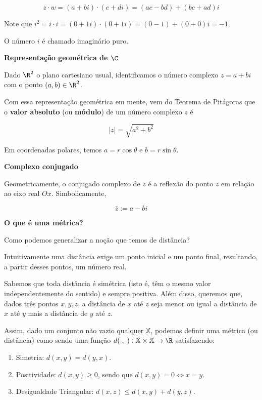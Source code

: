 \documentclass[
]{article}
\begin{document}
\[z \cdot w = (a+bi) \cdot (c+di) = (ac-bd) + (bc+ad)i\]

Note que
\(i^2 = i \cdot i = (0+1i) \cdot (0+1i) = (0-1) + (0+0)i = -1\).

O número \(i\) é chamado imaginário puro.

\textbf{Representação geométrica de \(\C\)}

Dado \(\R^2\) o plano cartesiano usual, identificamos o número complexo
\(z = a+bi\) com o ponto \((a, b) \in \R^2\).

Com essa representação geométrica em mente, vem do Teorema de Pitágoras
que o \textbf{valor absoluto} (ou \textbf{módulo}) de um número complexo
\(z\) é

\[|z| = \sqrt{a^2 + b^2}\]

Em coordenadas polares, temos \(a = r \cos \theta\) e
\(b = r \sin \theta\).

\textbf{Complexo conjugado}

Geometricamente, o conjugado complexo de \(z\) é a reflexão do ponto
\(z\) em relação ao eixo real \(Ox\). Simbolicamente,

\[\bar{z} := a-bi\]

\textbf{O que é uma métrica?}

Como podemos generalizar a noção que temos de distância?

Intuitivamente uma distância exige um ponto inicial e um ponto final,
resultando, a partir desses pontos, um número real.

Sabemos que toda distância é simétrica (isto é, têm o mesmo valor
independentemente do sentido) e sempre positiva. Além disso, queremos
que, dados três pontos \(x, y, z\), a distância de \(x\) até \(z\) seja
menor ou igual a distância de \(x\) até \(y\) mais a distância de \(y\)
até \(z\).

Assim, dado um conjunto não vazio qualquer \(\mathbb{X}\), podemos
definir uma métrica (ou distância) como sendo uma função
\(d(\cdot , \cdot): \mathbb{X} \times \mathbb{X} \to \R\) satisfazendo:

\begin{enumerate}
\def\labelenumi{\arabic{enumi}.}
\item
  Simetria: \(d(x,y) = d(y,x)\).
\item
  Positividade: \(d(x,y) \geq 0\), sendo que \(d(x,y) = 0 \iff x = y\).
\item
  Desigualdade Triangular: \(d(x,z) \leq d(x,y) + d(y,z)\).
\end{enumerate}
\end{document}
